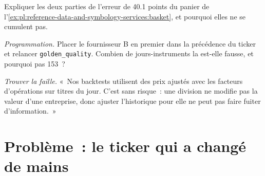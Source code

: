\begin{exercise}[$\star\star$]\label{exo:pl:reference-data-and-symbology-services:6}
Expliquer les deux parties de l'erreur de 40.1 points du panier de l'\cref{ex:pl:reference-data-and-symbology-services:basket}, et pourquoi elles ne
se cumulent pas.
\end{exercise}

\begin{exercise}[$\star\star\star$]\label{exo:pl:reference-data-and-symbology-services:7}
\emph{Programmation.} Placer le fournisseur B en premier dans la précédence du ticker et relancer \texttt{golden\_quality}. Combien de jours-instruments la
 est-elle fausse, et pourquoi pas 153~?
\end{exercise}

\begin{exercise}[$\star\star\star$]\label{exo:pl:reference-data-and-symbology-services:8}
\emph{Trouver la faille.} «~Nos backtests utilisent des prix ajustés avec les facteurs d'opérations sur titres du jour. C'est sans risque~: une division ne
modifie pas la valeur d'une entreprise, donc ajuster l'historique pour elle ne peut pas faire fuiter d'information.~»
\end{exercise}

\section{Problème~: le ticker qui a changé de mains}

